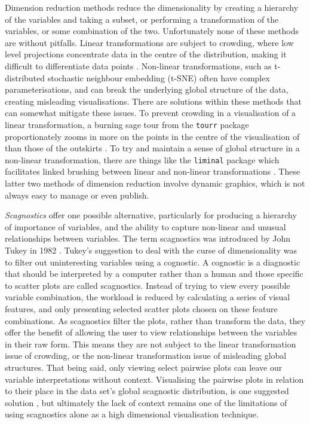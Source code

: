 Dimension reduction methods reduce the dimensionality by creating a
hierarchy of the variables and taking a subset, or performing a
transformation of the variables, or some combination of the two.
Unfortunately none of these methods are without pitfalls. Linear
transformations are subject to crowding, where low level projections
concentrate data in the centre of the distribution, making it difficult
to differentiate data points \citep{crowding}. Non-linear
transformations, such as t-distributed stochastic neighbour embedding
(t-SNE) \citep{tsne} often have complex parameterisations, and can break
the underlying global structure of the data, creating misleading
visualisations. There are solutions within these methods that can
somewhat mitigate these issues. To prevent crowding in a visualisation
of a linear transformation, a burning sage tour from the \texttt{tourr}
package proportionately zooms in more on the points in the centre of the
visualisation of than those of the outskirts \citep{burningsage}. To try
and maintain a sense of global structure in a non-linear transformation,
there are things like the \texttt{liminal} package which facilitates
linked brushing between linear and non-linear transformations
\citep{liminal}. These latter two methods of dimension reduction involve
dynamic graphics, which is not always easy to manage or even publish.

\emph{Scagnostics} offer one possible alternative, particularly for
producing a hierarchy of importance of variables, and the ability to
capture non-linear and unusual relationships between variables. The term
scagnostics was introduced by John Tukey in 1982 \citep{tukey}. Tukey's
suggestion to deal with the curse of dimensionality was to filter out
uninteresting variables using a cognostic. A cognostic is a diagnostic
that should be interpreted by a computer rather than a human and those
specific to scatter plots are called scagnostics. Instead of trying to
view every possible variable combination, the workload is reduced by
calculating a series of visual features, and only presenting selected
scatter plots chosen on these feature combinations. As scagnostics
filter the plots, rather than transform the data, they offer the benefit
of allowing the user to view relationships between the variables in
their raw form. This means they are not subject to the linear
transformation issue of crowding, or the non-linear transformation issue
of misleading global structures. That being said, only viewing select
pairwise plots can leave our variable interpretations without context.
Visualising the pairwise plots in relation to their place in the data
set's global scagnostic distribution, is one suggested solution
\citep{scagexplorer}, but ultimately the lack of context remains one of
the limitations of using scagnostics alone as a high dimensional
visualisation technique.


